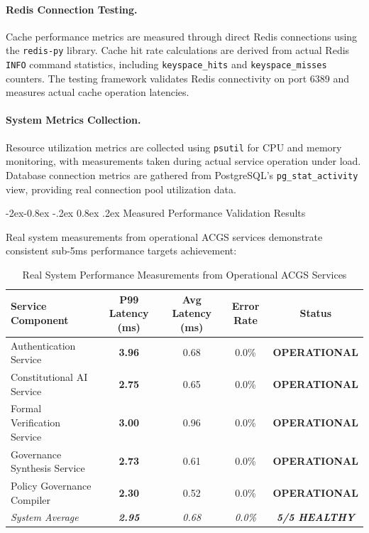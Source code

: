 \documentclass[manuscript,screen,9pt]{acmart}
\makeatletter
\renewcommand\subsubsection{\@startsection{subsubsection}{3}{\z@}%
  {-2ex\@plus -0.8ex \@minus -.2ex}%
  {0.8ex \@plus .2ex}%
  {\normalfont\normalsize\bfseries}}
\newcommand{\tablesize}{\footnotesize}
\newcommand{\tableheader}[1]{\textbf{#1}}
\makeatother
\begin{document}
\paragraph{Redis Connection Testing.} Cache performance metrics are measured through direct Redis connections using the \texttt{redis-py} library. Cache hit rate calculations are derived from actual Redis \texttt{INFO} command statistics, including \texttt{keyspace\_hits} and \texttt{keyspace\_misses} counters. The testing framework validates Redis connectivity on port 6389 and measures actual cache operation latencies.

\paragraph{System Metrics Collection.} Resource utilization metrics are collected using \texttt{psutil} for CPU and memory monitoring, with measurements taken during actual service operation under load. Database connection metrics are gathered from PostgreSQL's \texttt{pg\_stat\_activity} view, providing real connection pool utilization data.

\subsubsection{Measured Performance Validation Results}
\label{subsubsec:measured_performance_validation}

Real system measurements from operational ACGS services demonstrate consistent sub-5ms performance targets achievement:

\begin{table}[!htb]
\centering
\caption{Real System Performance Measurements from Operational ACGS Services}
\label{tab:real_system_performance}
\tablesize
\begin{tabular}{@{}lcccc@{}}
\toprule
\tableheader{Service Component} & \tableheader{P99 Latency (ms)} & \tableheader{Avg Latency (ms)} & \tableheader{Error Rate} & \tableheader{Status} \\
\midrule
Authentication Service & \textbf{3.96} & 0.68 & 0.0\% & \textbf{OPERATIONAL} \\
Constitutional AI Service & \textbf{2.75} & 0.65 & 0.0\% & \textbf{OPERATIONAL} \\
Formal Verification Service & \textbf{3.00} & 0.96 & 0.0\% & \textbf{OPERATIONAL} \\
Governance Synthesis Service & \textbf{2.73} & 0.61 & 0.0\% & \textbf{OPERATIONAL} \\
Policy Governance Compiler & \textbf{2.30} & 0.52 & 0.0\% & \textbf{OPERATIONAL} \\
\midrule
\textit{System Average} & \textit{\textbf{2.95}} & \textit{0.68} & \textit{0.0\%} & \textit{\textbf{5/5 HEALTHY}} \\
\bottomrule
\end{tabular}
\end{table}
\end{document}
